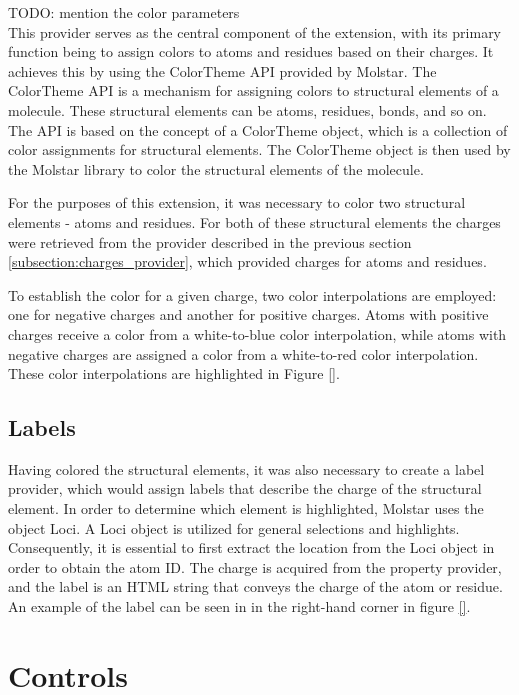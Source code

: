 \documentclass[
  digital,     %
  oneside,     %
  nosansbold,  %
  nocolorbold, %
  lof,         %
  lot,         %
]{fithesis4}
\begin{document}
TODO: mention the color parameters \\

This provider serves as the central component of the extension, with its primary function being to assign colors to atoms and residues based on their charges. It achieves this by using the ColorTheme API provided by Molstar. The ColorTheme API is a mechanism for assigning colors to structural elements of a molecule. These structural elements can be atoms, residues, bonds, and so on. The API is based on the concept of a ColorTheme object, which is a collection of color assignments for structural elements. The ColorTheme object is then used by the Molstar library to color the structural elements of the molecule.

For the purposes of this extension, it was necessary to color two structural elements - atoms and residues. For both of these structural elements the charges were retrieved from the provider described in the previous section \ref{subsection:charges_provider}, which provided charges for atoms and residues.

To establish the color for a given charge, two color interpolations are employed: one for negative charges and another for positive charges. Atoms with positive charges receive a color from a white-to-blue color interpolation, while atoms with negative charges are assigned a color from a white-to-red color interpolation. These color interpolations are highlighted in Figure \ref{}. 

\subsection{Labels}
\label{subsection:labels}

Having colored the structural elements, it was also necessary to create a label provider, which would assign labels that describe the charge of the structural element. In order to determine which element is highlighted, Molstar uses the object Loci. A Loci object is utilized for general selections and highlights. Consequently, it is essential to first extract the location from the Loci object in order to obtain the atom ID. The charge is acquired from the property provider, and the label is an HTML string that conveys the charge of the atom or residue. An example of the label can be seen in in the right-hand corner in figure \ref{}.

\section{Controls}
\label{section:controls}
\end{document}
